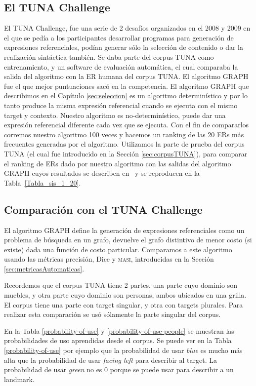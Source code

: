 \subsection{El TUNA Challenge}
El TUNA Challenge, fue una serie de 2 desaf\'ios organizados en el 2008 y 2009 en el que se ped\'ia a los participantes desarrollar programas para generaci\'on de expresiones referenciales, pod\'ian generar s\'olo la selecci\'on de contenido o dar la realizaci\'on sint\'actica tambi\'en.
Se daba parte del corpus TUNA como entrenamiento, y un software de evaluaci\'on autom\'atica, el cual comparaba la salida del algoritmo con la ER humana del corpus TUNA. El algoritmo GRAPH fue el que mejor puntuaciones sac\'o en la competencia.
El algoritmo GRAPH que describimos en el Cap\'itulo \ref{sec:seleccion} es un algoritmo determin\'istico y por lo tanto produce la misma expresi\'on referencial cuando se ejecuta con el mismo target y contexto. Nuestro algoritmo es no-determin\'istico, puede dar una expresi\'on referencial diferente cada vez que se ejecuta. Con el fin de compararlos corremos nuestro algoritmo 100 veces y hacemos un ranking de las 20 ERs m\'as frecuentes generadas por el algoritmo. Utilizamos la parte de prueba del corpus TUNA (el cual fue introducido en la Secci\'on \ref{sec:corpusTUNA}), para comparar el ranking de ERs dado por nuestro algoritmo con las salidas del algoritmo GRAPH cuyos resultados se describen en~\cite{KrahmerGRAPH} y se reproducen en la Tabla~\ref{Tabla_sis_1_20}.


\subsection{Comparaci\'on con el TUNA Challenge}
El algoritmo GRAPH define la generaci\'on de expresiones referenciales como un problema de b\'usqueda en un grafo, devuelve el grafo distintivo de menor costo (si existe) dada una funci\'on de costo particular. Comparamos a este algoritmo usando las m\'etricas precisi\'on, Dice y \textsc {masi}, introducidas en la Secci\'on \ref{sec:metricasAutomaticas}. 

Recordemos que el corpus TUNA tiene 2 partes, una parte cuyo dominio son muebles, y otra parte cuyo dominio son personas, ambos ubicados en una grilla. El corpus tiene una parte con target singular, y otra con targets plurales. Para realizar esta comparaci\'on se us\'o s\'olamente la parte singular del corpus.


En la Tabla \ref{probability-of-use} y \ref{probability-of-use-people} se muestran las probabilidades de uso aprendidas desde el corpus. Se puede ver en la Tabla \ref{probability-of-use} por ejemplo que la probabilidad de usar {\it blue} es mucho m\'as alta que la probabilidad de usar {\it facing left} para describir al target. La probabilidad de usar {\it green} no es 0 porque se puede usar para describir a un landmark.

